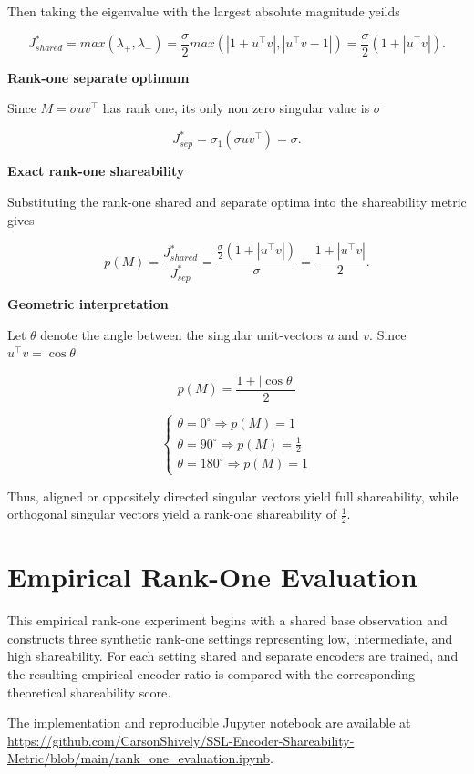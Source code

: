 \documentclass{article}
\begin{document}
Then taking the eigenvalue with the largest absolute magnitude yeilds

\[
J_{shared}^* = max(\lambda_+, \lambda_-) = \frac{\sigma}{2}max(|1 + u^\top v|, |u^\top v - 1|) = \frac{\sigma}{2}(1 + |u^\top v|).
\]

\textbf{Rank-one separate optimum}

Since \(M = \sigma u v^\top\) has rank one, its only non zero singular value is \(\sigma\)

\[
J_{sep}^* = \sigma_1(\sigma u v^\top) = \sigma.
\]

\textbf{Exact rank-one shareability}

Substituting the rank-one shared and separate optima into the shareability metric gives

\[
p(M) = \frac{J_{shared}^*}{J_{sep}^*} = \frac{\frac{\sigma}{2}(1 + |u^\top v|)}{\sigma} = \frac{1 + |u^\top v|}{2}.
\]

\textbf{Geometric interpretation}

Let \(\theta\) denote the angle between the singular unit-vectors \(u\) and \(v\). Since \(u^\top v = \cos\theta\)

\[
p(M) = \frac{1 + |\cos\theta|}{2}
\]

\[
\begin{cases}
    \theta = 0^\circ \Rightarrow p(M) = 1 \\
    \theta = 90^\circ \Rightarrow p(M) = \frac{1}{2} \\
    \theta = 180^\circ \Rightarrow p(M) = 1 
\end{cases}
\]

Thus, aligned or oppositely directed singular vectors yield full shareability, while orthogonal singular vectors yield a rank-one shareability of \(\frac{1}{2}\).

\section{Empirical Rank-One Evaluation}

This empirical rank-one experiment begins with a shared base observation and constructs three synthetic rank-one settings representing low, intermediate, and high shareability. For each setting shared and separate encoders are trained, and the resulting empirical encoder ratio is compared with the corresponding theoretical shareability score.

The implementation and reproducible Jupyter notebook are available at \url{https://github.com/CarsonShively/SSL-Encoder-Shareability-Metric/blob/main/rank_one_evaluation.ipynb}.
\end{document}
